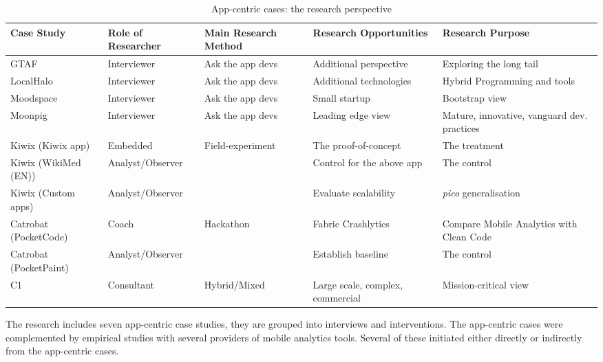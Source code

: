 \begin{table}
    \centering
    \tabcolsep=0.06cm
    \tiny
    \begin{tabular}{lllp{3.5cm}p{3.5cm}}\toprule
    Case Study                 & Role of Researcher &  Main Research Method   & Research Opportunities             & Research Purpose \\
    \midrule
    GTAF                       & Interviewer        & Ask the app devs & Additional perspective & Exploring the long tail \\
    LocalHalo                  & Interviewer        & Ask the app devs & Additional technologies & Hybrid Programming and tools \\
    Moodspace                  & Interviewer        & Ask the app devs & Small startup &Bootstrap view \\
    Moonpig                    & Interviewer        & Ask the app devs & Leading edge view & Mature, innovative, vanguard dev. practices \\
    \midrule
    Kiwix (Kiwix app)          & Embedded           & Field-experiment   & The proof-of-concept      & The treatment \\ 
    Kiwix (WikiMed (EN))       & Analyst/Observer   &                    & Control for the above app & The control  \\
    Kiwix (Custom apps)        & Analyst/Observer   &                    & Evaluate scalability      & \textit{pico} generalisation \\
    \midrule
    Catrobat (PocketCode)      & Coach              & Hackathon   & Fabric Crashlytics        & Compare Mobile Analytics with Clean Code \\
    Catrobat (PocketPaint)     & Analyst/Observer   &                    & Establish baseline        & The control  \\
     \midrule
    C1                         & Consultant         & Hybrid/Mixed & Large scale, complex, commercial & Mission-critical view \\
    \bottomrule
    \end{tabular}
    \caption{App-centric cases: the research perspective}
    \label{tab:app-centric-studies-research-perspective}
\end{table}

The research includes seven app-centric case studies, they are grouped into interviews and interventions. The app-centric cases were complemented by empirical studies with several providers of mobile analytics tools. Several of these initiated either directly or indirectly from the app-centric cases. 

